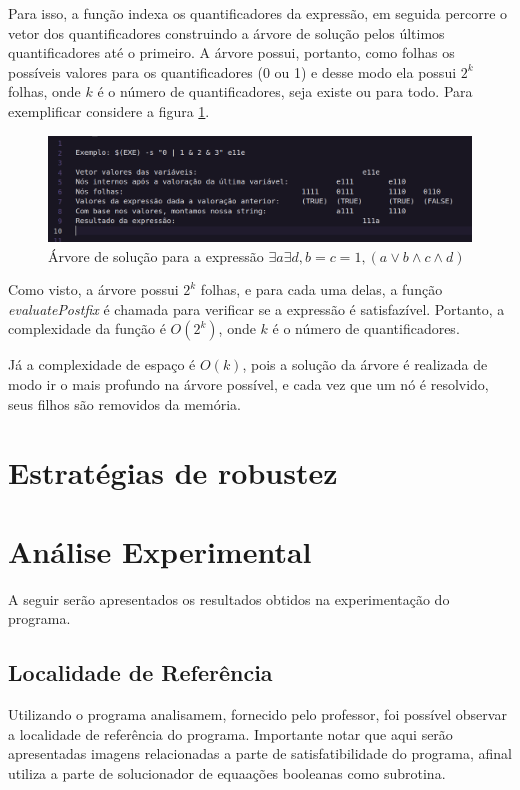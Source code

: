 \documentclass{article}
\begin{document}
Para isso, a função indexa os quantificadores da expressão, em seguida percorre o vetor dos quantificadores construindo a árvore de solução pelos últimos quantificadores até o primeiro.
A árvore possui, portanto, como folhas os possíveis valores para os quantificadores (0 ou 1) e desse modo ela possui $2^k$ folhas, onde $k$ é o número de quantificadores, seja existe ou para todo. Para exemplificar considere a figura \ref{fig:sat_tree}.

\begin{figure}[H]
    \centering
    \includegraphics[width=\textwidth]{./images/sat_tree.png}
    \caption{Árvore de solução para a expressão $\exists a \exists d , b = c = 1,  (a \lor b \land c \land d)$}
    \label{fig:sat_tree}
\end{figure}

Como visto, a árvore possui $2^k$ folhas, e para cada uma delas, a função \textit{evaluatePostfix} é chamada para verificar se a expressão é satisfazível. Portanto, a complexidade da função é $O(2^k)$, onde $k$ é o número de quantificadores.

Já a complexidade de espaço é $O(k)$, pois a solução da árvore é realizada de modo ir o mais profundo na árvore possível, e cada vez que um nó é resolvido, seus filhos são removidos da memória.
\section{Estratégias de robustez}

\section{Análise Experimental}

A seguir serão apresentados os resultados obtidos na experimentação do programa.

\subsection{Localidade de Referência}

Utilizando o programa analisamem, fornecido pelo professor, foi possível observar a localidade de referência do programa. Importante notar que aqui serão apresentadas imagens relacionadas a parte de satisfatibilidade do programa, afinal utiliza a parte de solucionador de equaações booleanas como subrotina.
\end{document}
